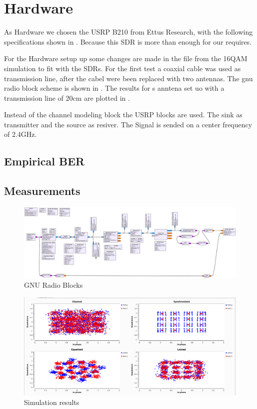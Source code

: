 \section{Hardware}

As Hardware we chosen the USRP B210 from Ettus Research, with the following specifications shown in . Because this SDR is more than enough for our requires.

For the Hardware setup up some changes are made in the file from the 16QAM simulation to fit with the SDRs. For the first test a coaxial cable was used as transmission line, after the cabel were been replaced with two antennas. The gnu radio block scheme is shown in . The results for s anntena set uo with a transmission line of 20cm  are plotted in .

Instead of the channel modeling block the USRP blocks are used. The sink as transmitter and the source as resiver.  The Signal is sended on a center frequency of 2.4GHz.

\subsection{Empirical BER} \label{sec:ber}

\subsection{Measurements}

%
%
%

\begin{figure}
	\includegraphics[width=\linewidth]{./figures/pdfs/qam_nogui.pdf}
	\caption{GNU Radio Blocks}
	\label{fig:simul16QAM_block}	
\end{figure}

\begin{figure}
	\includegraphics[width=\linewidth]{./figures/screenshots/QAM16_Fading_2.png}
	\caption{Simulation results}
	\label{fig:simul16QAM}	
\end{figure}

